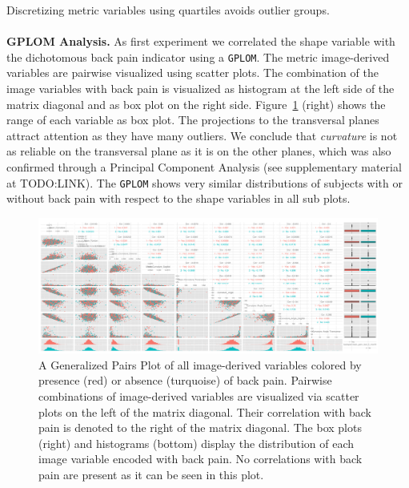\documentclass[a4paper,twoside]{style/article}
\begin{document}
Discretizing metric variables using quartiles avoids outlier groups.
\\\\
\noindent \textbf{GPLOM Analysis.}
As first experiment we correlated the shape variable with the dichotomous back pain indicator using a \texttt{GPLOM}.
The metric image-derived variables are pairwise visualized using scatter plots.
The combination of the image variables with back pain is visualized as histogram at the left side of the matrix diagonal and as box plot on the right side.
Figure~\ref{fig:image-parameter-range} (right) shows the range of each variable as box plot.
The projections to the transversal planes attract attention as they have many outliers.
We conclude that \emph{curvature} is not as reliable on the transversal plane as it is on the other planes, which was also confirmed through a Principal Component Analysis (see supplementary material at TODO:LINK).
The \texttt{GPLOM} shows very similar distributions of subjects with or without back pain with respect to the shape variables in all sub plots.
\begin{figure}[htb]
  \centering
  \includegraphics[width=1.0\textwidth]{figures/image-parameter-range}
  \caption{
A Generalized Pairs Plot of all image-derived variables colored by presence (red) or absence (turquoise) of back pain.
Pairwise combinations of image-derived variables are visualized via scatter plots on the left of the matrix diagonal.
Their correlation with back pain is denoted to the right of the matrix diagonal.
The box plots (right) and histograms (bottom) display the distribution of each image variable encoded with back pain.
No correlations with back pain are present as it can be seen in this plot.
}
  \label{fig:image-parameter-range}
\end{figure}
\end{document}
